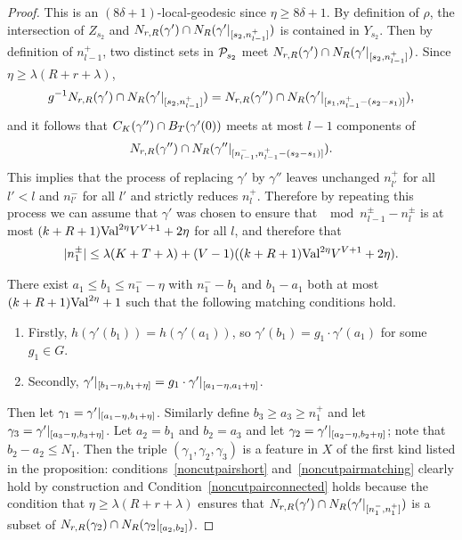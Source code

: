 \begin{proof}
  This is an $(8\delta+1)$-local-geodesic since $\eta \geq 8\delta+1$. 
  By definition of $\rho$, the intersection of $Z_{s_2}$ and $N_{r, R}(\gamma') \cap N_R(\gamma'\vert_{[s_2, n_{l-1}^+]})$ is contained in $Y_{s_2}$. 
  Then by definition of $n_{l-1}^+$, two distinct sets in $\mathcal{P}_{s_2}$ meet $N_{r, R}(\gamma') \cap N_R(\gamma'\vert_{[s_2, n_{l-1}^+]})$. 
  Since $\eta \geq \lambda(R + r + \lambda)$,
  \begin{align}
    g^{-1}N_{r, R}(\gamma') \cap N_R(\gamma'\vert_{[s_2, n_{l-1}^+]})
    = N_{r, R}(\gamma'') \cap N_R(\gamma'\vert_{[s_1, n_{l-1}^+ -
    (s_2 - s_1)]}),
  \end{align}
  and it follows that $C_K(\gamma'') \cap B_{T}(\gamma'(0))$ meets at most $l-1$ components of 
  \begin{align}
    N_{r, R}(\gamma'') \cap N_R(\gamma''\vert_{[n_{l-1}^-, n_{l-1}^+ - (s_2 - s_1)]}). 
  \end{align}
  This implies that the process of replacing $\gamma'$ by $\gamma''$ leaves unchanged $n_{l'}^+$ for all $l' < l$ and $n_{l'}^-$ for all $l'$ and strictly reduces $n_l^+$.  
  Therefore by repeating this process we can assume that $\gamma'$ was chosen to ensure that $\mod{n_{l-1}^\pm - n_l^\pm}$ is at most $(k+R+1)\mathrm{Val}^{2\eta}V^{V+1} + 2\eta$ for all $l$, and therefore that 
  \begin{align}
    \vert n_1^\pm\vert \leq \lambda(K + T + \lambda) + (V-1)((k+R+1)\mathrm{Val}^{2\eta}V^{V+1} + 2\eta).
  \end{align}

  There exist $a_1 \leq b_1 \leq n_1^- - \eta$ with $n_1^- - b_1$ and $b_1 - a_1$ both at most $(k+R+1)\mathrm{Val}^{2\eta} + 1$ such that the following matching conditions hold.
  \begin{enumerate}
    \item Firstly, $h(\gamma'(b_1)) = h(\gamma'(a_1))$, so $\gamma'(b_1) = g_1\cdot \gamma'(a_1)$ for some $g_1 \in G$.
    \item Secondly, $\gamma'\vert_{[b_1 - \eta, b_1 + \eta]} = g_1\cdot\gamma'\vert_{[a_1 - \eta, a_1 + \eta]}$.
  \end{enumerate}
  Then let $\gamma_1 = \gamma'\vert_{[a_1 - \eta, b_1+\eta]}$. 
  Similarly define $b_3 \geq a_3 \geq n_1^+$ and let $\gamma_3 = \gamma'\vert_{[a_3 - \eta, b_3 + \eta]}$. 
  Let $a_2 = b_1$ and $b_2 = a_3$ and let $\gamma_2 = \gamma'\vert_{[a_2 - \eta, b_2 + \eta]}$; note that $b_2 - a_2 \leq N_1$.  
  Then the triple $(\gamma_1, \gamma_2, \gamma_3)$ is a feature in $X$ of the first kind listed in the proposition: conditions~\ref{noncutpairshort} and~\ref{noncutpairmatching} clearly hold by construction and Condition~\ref{noncutpairconnected} holds because the condition that $\eta \geq \lambda(R + r + \lambda)$ ensures that $N_{r, R}(\gamma') \cap N_R(\gamma'\vert_{[n_1^-, n_1^+]})$ is a subset of $N_{r, R}(\gamma_2) \cap N_R(\gamma_2\vert_{[a_2, b_2]})$.


\end{proof}
